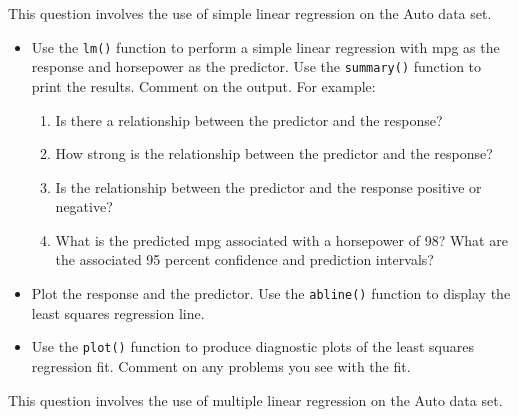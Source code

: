 \documentclass[11pt]{scrartcl}
\begin{document}
This question involves the use of simple linear regression on the Auto data set.

\begin{itemize}
\item Use the \texttt{lm()} function to perform a simple linear regression with mpg as the
response and horsepower as the predictor. Use the \texttt{summary()} function to
print the results. Comment on the output. For example:
\begin{enumerate}
\item Is there a relationship between the predictor and the response?
\item How strong is the relationship between the predictor and the response?
\item Is the relationship between the predictor and the response positive or
negative?
\item What is the predicted mpg associated with a horsepower of 98? What are the
associated 95 percent conﬁdence and prediction intervals?
\end{enumerate}
\item Plot the response and the predictor. Use the \texttt{abline()} function to display
the least squares regression line.
\item Use the \texttt{plot()} function to produce diagnostic plots of the least squares
regression ﬁt. Comment on any problems you see with the ﬁt.
\end{itemize}

This question involves the use of multiple linear regression on the Auto data
set.
\end{document}
